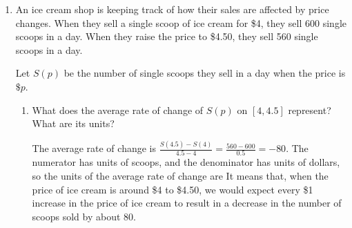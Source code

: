 \documentclass{article}
\begin{document}
\begin{enumerate}
\begin{enumerate}
    \begin{solution}
      Using the definition of average rate of change,
      \begin{align*}
        \frac{f(3+h)-f(3)}{(3+h) - 3} &= \frac{\left((3+h)^2 - (3+h)\right) - \left(3^2 - 3\right)}{(3+h)-3} \\[2pt]
        &= \frac{9+6h+h^2 - (3+h) - 6}{h} \\[2pt]
        &= \frac{5h + h^2}{h} \\[2pt]
        &= 5 + h,\, h \neq 0.
      \end{align*}
    \end{solution}

  \item
    \begin{problem}[\nstretch{0.5}]
      Does your answer to \ref{compute-AROC-with-h} work when $h < 0$? 
    \end{problem}

    \begin{solution}
        Yes, the answer still works when $h$ is negative. However, $h$ cannot be zero.
    \end{solution}

  \end{enumerate}

\item  \label{AROC-ice-cream}


  An ice cream shop is keeping track of how their sales are affected by price changes. When they sell a single scoop of ice cream for \$4, they sell 600 single scoops in a day. When they raise the price to \$4.50, they sell 560 single scoops in a day.

  Let $S(p)$ be the number of single scoops they sell in a day when the price is $\$p$.

  \begin{enumerate}
  \item
    \begin{problem}[1in]
      What does the average rate of change of $S(p)$ on $[4, 4.5]$ represent? What are its units?
    \end{problem}

    \begin{solution}
      The average rate of change is $\frac{S(4.5)-S(4)}{4.5-4}=\frac{560-600}{0.5}=-80$. 
      The numerator has units of scoops, and the denominator has units of dollars, 
      so the units of the average rate of change are  It means that,
      when the price of ice cream is around \$4 to \$4.50, we would expect every \$1 increase in the price of ice cream
      to result in a decrease in the number of scoops sold by about 80.
    \end{solution}


\end{enumerate}
\end{enumerate}
\end{document}
